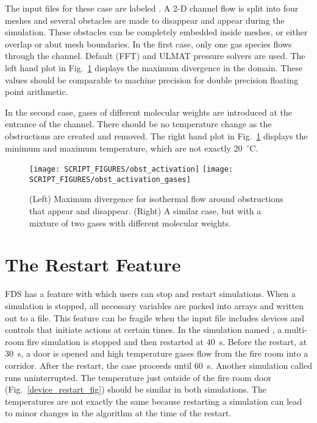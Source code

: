 \documentclass[11pt]{book}
\begin{document}
The input files for these case are labeled . A 2-D channel flow is split into four meshes and several obstacles are made to disappear and appear during the simulation. These obstacles can be completely embedded inside meshes, or either overlap or abut mesh boundaries. In the first case, only one gas species flows through the channel. Default (FFT) and ULMAT pressure solvers are used. The left hand plot in Fig.~\ref{obst_act_fig} displays the maximum divergence in the domain. These values should be comparable to machine precision for double precision floating point arithmetic.

In the second case, gases of different molecular weights are introduced at the entrance of the channel. There should be no temperature change as the obstructions are created and removed. The right hand plot in Fig.~\ref{obst_act_fig} displays the minimum and maximum temperature, which are not exactly 20~$^\circ$C.

\begin{figure}[!ht]
\texttt{[image: SCRIPT\_FIGURES/obst\_activation]}
\texttt{[image: SCRIPT\_FIGURES/obst\_activation\_gases]}
\caption[Result of the  test cases]{(Left) Maximum divergence for isothermal flow around obstructions that appear and disappear. (Right) A similar case, but with a mixture of two gases with different molecular weights.}
\label{obst_act_fig}
\end{figure}


\newpage

\section{The Restart Feature}
\label{device_restart}
\label{clocks_restart}

FDS has a feature with which users can stop and restart simulations. When a simulation is stopped, all necessary variables are packed into arrays and written out to a file. This feature can be fragile when the input file includes devices and controls that initiate actions at certain times. In the simulation named , a multi-room fire simulation is stopped and then restarted at 40~s. Before the restart, at 30~s, a door is opened and high temperature gases flow from the fire room into a corridor. After the restart, the case proceeds until 60~s. Another simulation called  runs uninterrupted. The temperature just outside of the fire room door (Fig.~\ref{device_restart_fig}) should be similar in both simulations. The temperatures are not exactly the same because restarting a simulation can lead to minor changes in the algorithm at the time of the restart.
\end{document}
